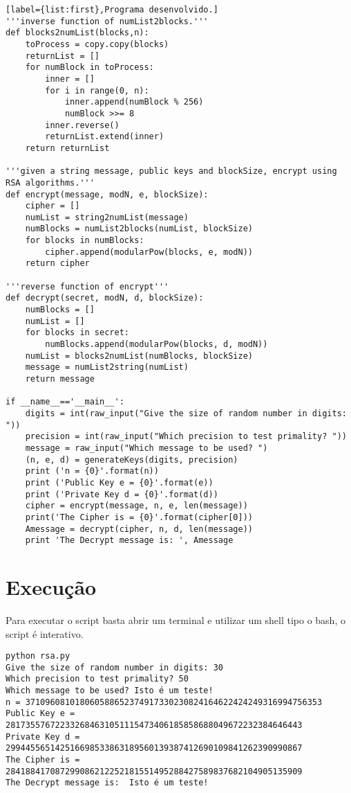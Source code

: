 \documentclass[a4paper,11pt]{article}
\theoremstyle{mytheor}
\begin{document}
\begin{lstlisting}[label={list:first},Programa desenvolvido.]
'''inverse function of numList2blocks.'''
def blocks2numList(blocks,n):
    toProcess = copy.copy(blocks)
    returnList = []
    for numBlock in toProcess:
        inner = []
        for i in range(0, n):
            inner.append(numBlock % 256)
            numBlock >>= 8
        inner.reverse()
        returnList.extend(inner)
    return returnList

'''given a string message, public keys and blockSize, encrypt using RSA algorithms.'''
def encrypt(message, modN, e, blockSize):
    cipher = []
    numList = string2numList(message)
    numBlocks = numList2blocks(numList, blockSize)
    for blocks in numBlocks:
        cipher.append(modularPow(blocks, e, modN))
    return cipher

'''reverse function of encrypt'''
def decrypt(secret, modN, d, blockSize):
    numBlocks = []
    numList = []
    for blocks in secret:
        numBlocks.append(modularPow(blocks, d, modN))
    numList = blocks2numList(numBlocks, blockSize)
    message = numList2string(numList)
    return message

if __name__=='__main__':
    digits = int(raw_input("Give the size of random number in digits: "))
    precision = int(raw_input("Which precision to test primality? "))
    message = raw_input("Which message to be used? ")
    (n, e, d) = generateKeys(digits, precision)
    print ('n = {0}'.format(n))
    print ('Public Key e = {0}'.format(e))
    print ('Private Key d = {0}'.format(d))
    cipher = encrypt(message, n, e, len(message))
    print('The Cipher is = {0}'.format(cipher[0]))
    Amessage = decrypt(cipher, n, d, len(message))
    print 'The Decrypt message is: ', Amessage
\end{lstlisting}

\section*{Execução}

Para executar o script basta abrir um terminal e utilizar um shell tipo o bash, o script é interativo.

\begin{lstlisting}[label={list:second},caption=Executando o script.]
python rsa.py 
Give the size of random number in digits: 30
Which precision to test primality? 50
Which message to be used? Isto é um teste! 
n = 371096081018060588652374917330230824164622424249316994756353
Public Key e = 281735576722332684631051115473406185858688049672232384646443
Private Key d = 299445565142516698533863189560139387412690109841262390990867
The Cipher is = 284188417087299086212252181551495288427589837682104905135909
The Decrypt message is:  Isto é um teste!

\end{lstlisting}
\end{document}
